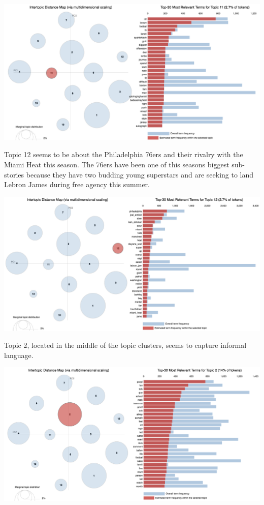 \documentclass[11pt]{article}
\begin{document}
\includegraphics[width=470pt]{11.png} 

Topic 12 seems to be about the Philadelphia 76ers and their rivalry with the Miami Heat this season. The 76ers have been one of this seasons biggest sub-stories because they have two budding young superstars and are seeking to land Lebron James during free agency this summer.

\includegraphics[width=470pt]{12.png} 

Topic 2, located in the middle of the topic clusters, seems to capture informal language. 

\includegraphics[width=470pt]{2.png} 
\end{document}
